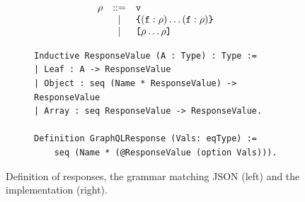 \begin{figure}[h]
\centering
\begin{subfigure}{.5\textwidth}

  \begin{displaymath}
	\begin{array}{rcl}
	\rho & ::= & \texttt{v}\\
	& | & \texttt{\{} (\texttt{f} : \rho) \ldots (\texttt{f} : \rho) \texttt{\}} \\
	& | & \texttt{[} \rho \ldots \rho \texttt{]}
	\end{array}
	\end{displaymath}
	
	

 
  \end{subfigure}%
  \begin{subfigure}{.5\textwidth}
\begin{verbatim}
Inductive ResponseValue (A : Type) : Type :=
| Leaf : A -> ResponseValue
| Object : seq (Name * ResponseValue) -> ResponseValue
| Array : seq ResponseValue -> ResponseValue.

Definition GraphQLResponse (Vals: eqType) :=
    seq (Name * (@ResponseValue (option Vals))).
\end{verbatim}
   
  \end{subfigure}
  \caption{Definition of \gql responses, the grammar matching JSON (left) and the \coq implementation (right).
  }
  \label{fig:response_def}

\end{figure}
%


